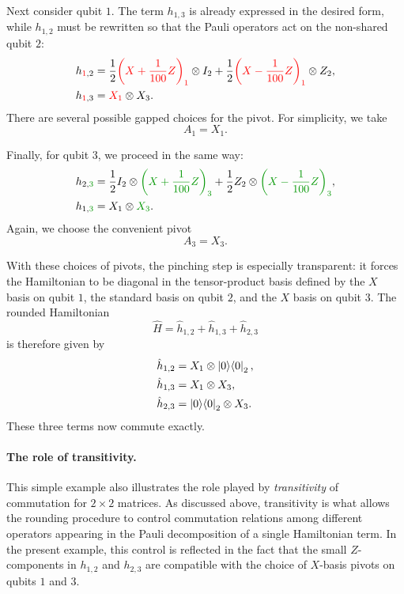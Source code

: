\documentclass[11pt]{article}
\newcommand{\DarkGreen}[1]{\textcolor{DarkGreen}{#1}}
\newcommand{\red}[1]{{\color{red}#1}}
\theoremstyle{plain}
\newcommand{\proj}[1]{\ket{#1}\!\bra{#1}}
\begin{document}
Next consider qubit $1$.  The term $h_{1,3}$ is already expressed in the
desired form, while $h_{1,2}$ must be rewritten so that the Pauli operators
act on the non-shared qubit $2$:
\begin{align*}
    h_{\red{1},2}
        &= \frac{1}{2} \red{\left(X + \frac{1}{100} Z\right)_1}
            \otimes I_2
        + \frac{1}{2} \red{\left(X - \frac{1}{100} Z\right)_1}
            \otimes Z_2, \\
    h_{\red{1},3}
        &= \red{X_1} \otimes X_3 .
\end{align*}
There are several possible gapped choices for the pivot.  For simplicity,
we take
\[
    A_1 = X_1 .
\]

Finally, for qubit $3$, we proceed in the same way:
\begin{align*}
    h_{2,\DarkGreen{3}}
        &= \frac{1}{2} I_2 \otimes
            \DarkGreen{\left(X + \frac{1}{100} Z\right)_3}
        + \frac{1}{2} Z_2 \otimes
            \DarkGreen{\left(X - \frac{1}{100} Z\right)_3}, \\
    h_{1,\DarkGreen{3}}
        &= X_1 \otimes \DarkGreen{X_3}.
\end{align*}
Again, we choose the convenient pivot
\[
    A_3 = X_3 .
\]

With these choices of pivots, the pinching step is especially transparent:
it forces the Hamiltonian to be diagonal in the tensor-product basis
defined by the $X$ basis on qubit $1$, the standard basis on qubit $2$,
and the $X$ basis on qubit $3$.  The rounded Hamiltonian
\[
    \hat H = \hat h_{1,2} + \hat h_{1,3} + \hat h_{2,3}
\]
is therefore given by
\begin{align*}
    \hat h_{1,2} &= X_1 \otimes \proj{0}_2, \\
    \hat h_{1,3} &= X_1 \otimes X_3, \\
    \hat h_{2,3} &= \proj{0}_2 \otimes X_3.
\end{align*}
These three terms now commute exactly.

\paragraph{The role of transitivity.}

This simple example also illustrates the role played by \emph{transitivity} of
commutation for $2 \times 2$ matrices.  As discussed above, transitivity
is what allows the rounding procedure to control commutation relations
among different operators appearing in the Pauli decomposition of a
single Hamiltonian term.  In the present example, this control is reflected
in the fact that the small $Z$-components in $h_{1,2}$ and $h_{2,3}$ are
compatible with the choice of $X$-basis pivots on qubits $1$ and $3$.
\end{document}
